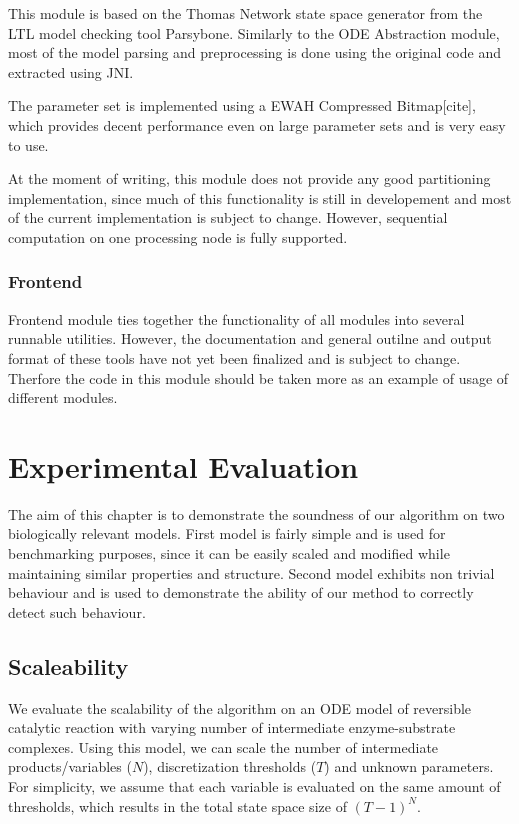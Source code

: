 \documentclass[12pt,oneside, draft]{fithesis2}
\begin{document}
			This module is based on the Thomas Network state space generator from the LTL model checking tool Parsybone. Similarly to the ODE Abstraction module, most of the model parsing and preprocessing is done using the original code and extracted using JNI. 
				
			The parameter set is implemented using a EWAH Compressed Bitmap[cite], which provides decent performance even on large parameter sets and is very easy to use. 
				
			At the moment of writing, this module does not provide any good partitioning implementation, since much of this functionality is still in developement and most of the current implementation is subject to change. However, sequential computation on one processing node is fully supported.
				
		\subsection{Frontend}			
			
			Frontend module ties together the functionality of all modules into several runnable utilities. However, the documentation and general outilne and output format of these tools have not yet been finalized and is subject to change. Therfore the code in this module should be taken more as an example of usage of different modules.	
				
	\chapter{Experimental Evaluation}

			The aim of this chapter is to demonstrate the soundness of our algorithm on two biologically relevant models. First model is fairly simple and is used for benchmarking purposes, since it can be easily scaled and modified while maintaining similar properties and structure. Second model exhibits non trivial behaviour and is used to demonstrate the ability of our method to correctly detect such behaviour. 
		
			\section{Scaleability}	
			
				We evaluate the scalability of the algorithm on an ODE model of reversible catalytic reaction with varying number of intermediate enzyme-substrate complexes.  Using this model, we can scale the number of intermediate products/variables ($N$), discretization thresholds ($T$) and unknown parameters. For simplicity, we assume that each variable is evaluated on the same amount of thresholds, which results in the total state space size of $(T - 1)^N$. 
				
\end{document}

